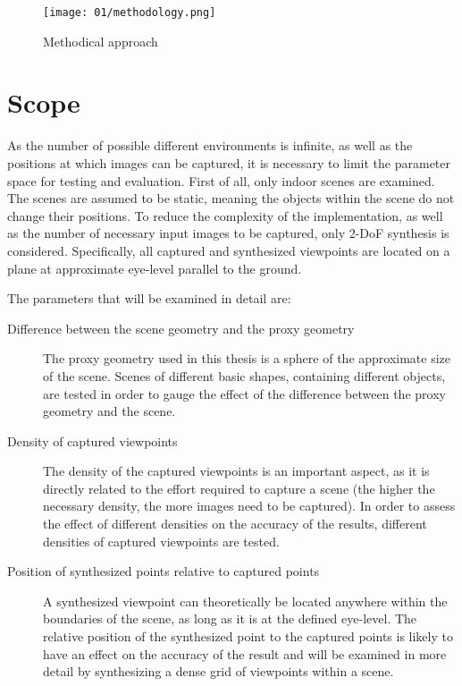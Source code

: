 \begin{figure}
		\centering
		\texttt{[image: 01/methodology.png]}
		\caption{Methodical approach}
		\label{fig:methodology}
\end{figure}


\section*{Scope}
As the number of possible different environments is infinite, as well as the positions at which images can be captured, it is necessary to limit the parameter space for testing and evaluation. First of all, only indoor scenes are examined. The scenes are assumed to be static, meaning the objects within the scene do not change their positions. To reduce the complexity of the implementation, as well as the number of necessary input images to be captured, only 2-DoF synthesis is considered. Specifically, all captured and synthesized viewpoints are located on a plane at approximate eye-level parallel to the ground. 

The parameters that will be examined in detail are:
\begin{description}
  \item[Difference between the scene geometry and the proxy geometry] The proxy geometry used in this thesis is a sphere of the approximate size of the scene. Scenes of different basic shapes, containing different objects, are tested in order to gauge the effect of the difference between the proxy geometry and the scene.
  \item[Density of captured viewpoints] The density of the captured viewpoints is an important aspect, as it is directly related to the effort required to capture a scene (the higher the necessary density, the more images need to be captured). In order to assess the effect of different densities on the accuracy of the results, different densities of captured viewpoints are tested.
  \item[Position of synthesized points relative to captured points] A synthesized viewpoint can theoretically be located anywhere within the boundaries of the scene, as long as it is at the defined eye-level. The relative position of the synthesized point to the captured points is likely to have an effect on the accuracy of the result and will be examined in more detail by synthesizing a dense grid of viewpoints within a scene.
\end{description}

